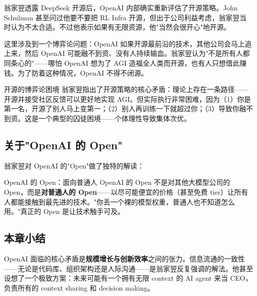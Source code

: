 翁家翌透露 DeepSeek 开源后，OpenAI 内部确实重新评估了开源策略。John Schulman 甚至问过他要不要把 RL Infra 开源，但出于公司利益考虑，翁家翌当时认为不太合适。不过他表示如果有无限资源，他"当然会很开心"地开源。

这里涉及到一个博弈论问题：OpenAI 如果开源最前沿的技术，其他公司会马上追上来，然后 OpenAI 可能融不到资、没有人持续输血。翁家翌认为"不是所有人都同条心的"——哪怕 OpenAI 想为了 AGI 造福全人类而开源，也有人只想借此赚钱。为了防着这种情况，OpenAI 不得不闭源。

\begin{knowledgebox}{开源的博弈论困境}
翁家翌指出了开源策略的核心矛盾：理论上存在一条路径——开源并接受社区反馈可以更好地实现 AGI。但实际执行非常困难，因为（1）你是第一名，开源了别人马上变第一；（2）别人再训练一下就超过你；（3）导致你融不到资。这是一个典型的囚徒困境——个体理性导致集体次优。
\end{knowledgebox}

\subsection{关于"OpenAI 的 Open"}

翁家翌对 OpenAI 的"Open"做了独特的解读：

\begin{importantbox}{OpenAI 的 Open：面向普通人}
OpenAI 的 Open 不是对其他大模型公司的 Open，而是\textbf{对普通人的 Open}——以尽可能便宜的价格（甚至免费 tier）让所有人都能接触到最先进的技术。"你丢一个裸的模型权重，普通人也不知道怎么用。"真正的 Open 是让技术触手可及。
\end{importantbox}

\subsection{本章小结}

OpenAI 面临的核心矛盾是\textbf{规模增长与创新效率}之间的张力。信息流通的一致性——无论是代码库、组织架构还是人际沟通——是翁家翌反复强调的解法。他甚至设想了一个极致方案：未来可能有一个拥有无限 context 的 AI agent 来当 CEO，负责所有的 context sharing 和 decision making。


